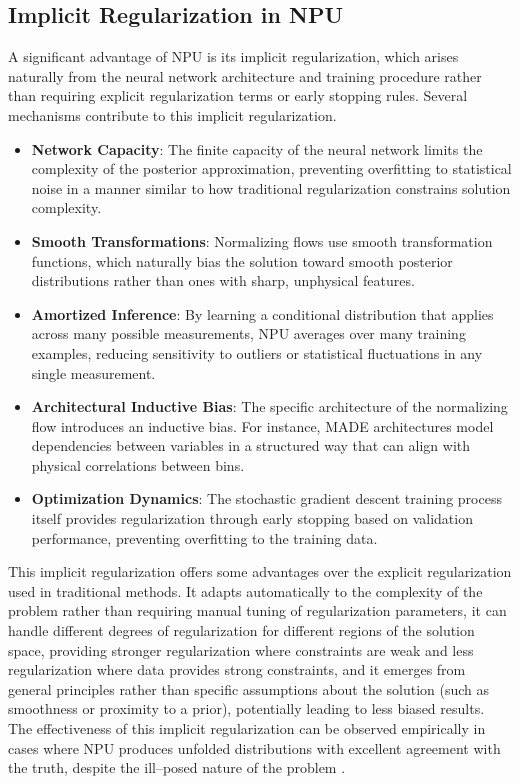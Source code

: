 \subsection{Implicit Regularization in NPU}
    A significant advantage of NPU is its implicit regularization, which arises naturally from the neural network architecture and training procedure rather than requiring explicit regularization terms or early stopping rules.
    Several mechanisms contribute to this implicit regularization.
    \begin{itemize}
        \item \textbf{Network Capacity}: The finite capacity of the neural network limits the complexity of the posterior approximation, preventing overfitting to statistical noise in a manner similar to how traditional regularization constrains solution complexity.
        \item \textbf{Smooth Transformations}: Normalizing flows use smooth transformation functions, which naturally bias the solution toward smooth posterior distributions rather than ones with sharp, unphysical features.
        \item \textbf{Amortized Inference}: By learning a conditional distribution that applies across many possible measurements, NPU averages over many training examples, reducing sensitivity to outliers or statistical fluctuations in any single measurement.
        \item \textbf{Architectural Inductive Bias}: The specific architecture of the normalizing flow introduces an inductive bias.
        For instance, MADE architectures model dependencies between variables in a structured way that can align with physical correlations between bins.
        \item \textbf{Optimization Dynamics}: The stochastic gradient descent training process itself provides regularization through early stopping based on validation performance, preventing overfitting to the training data.
    \end{itemize}
    This implicit regularization offers some advantages over the explicit regularization used in traditional methods.
    It adapts automatically to the complexity of the problem rather than requiring manual tuning of regularization parameters,
    it can handle different degrees of regularization for different regions of the solution space, providing stronger regularization where constraints are weak and less regularization where data provides strong constraints, and
    it emerges from general principles rather than specific assumptions about the solution (such as smoothness or proximity to a prior), potentially leading to less biased results.
    The effectiveness of this implicit regularization can be observed empirically in cases where NPU produces unfolded distributions with excellent agreement with the truth, despite the ill--posed nature of the problem .

